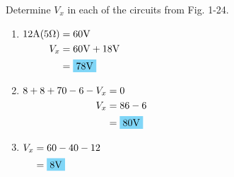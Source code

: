 Determine $V_x$ in each of the circuits from Fig. 1-24.

\begin{enumerate}[leftmargin=2cm,labelsep=.5cm,label=\bfseries\alph*)]
	\item $
	\begin{aligned}[t]
	12\qw{\A}(5\qw{\ohm}) &= 60\qw{\V} \\
	V_x &= 60\qw{\V}+18\qw{\V} \\
	&= \hlbox{78\qw{\V}}
	\end{aligned} $
	\\[1cm]
	
	\item $
	\begin{aligned}[t]
	8+8+70-6-V_x &= 0 \\
	V_x &= 86-6 \\
	&= \hlbox{80\qw{\V}}
	\end{aligned} $
	\\[1cm]
	
	\item $
	\begin{aligned}[t]
	V_x &= 60-40-12 \\
	&= \hlbox{8\qw{\V}}
	\end{aligned} $
	\\[1cm]
\end{enumerate}